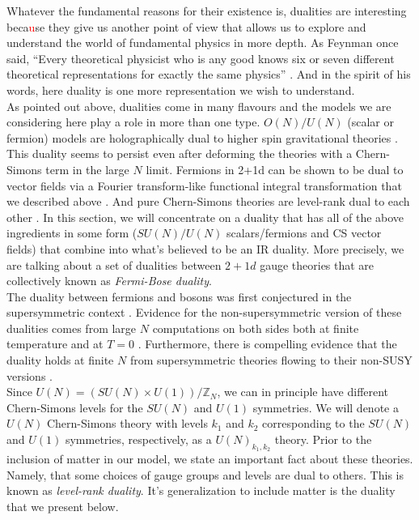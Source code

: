         Whatever the fundamental reasons for their existence is, dualities are interesting beca\textcolor{red}{u}se they give us another point of view that allows us to explore and understand the world of fundamental physics in more depth. As Feynman once said, ``Every theoretical physicist who is any good knows six or seven different theoretical representations for exactly the same physics'' \cite{Feynman_quote}. And in the spirit of his words, here duality is one more representation we wish to understand.\\
        \indent As pointed out above, dualities come in many flavours and the models we are considering here play a role in more than one type. $O(N)/U(N)$ (scalar or fermion) models are holographically dual to higher spin gravitational theories \cite{Klebanov:2002ja}. This duality seems to persist even after deforming the theories with a Chern-Simons term in the large $N$ limit\cite{Aharony:2011jz}. Fermions in 2+1d can be shown to be dual to vector fields via a Fourier transform-like functional integral transformation that we described above \cite{Burgess:1993np, Barci:1995iy}. And pure Chern-Simons theories are level-rank dual to each other \cite{Naculich:1990pa, Camperi:1990dk, Mlawer:1990uv, Nakanishi:1990hj, Naculich:2007nc}. In this section, we will concentrate on a duality that has all of the above ingredients in some form ($SU(N)/U(N)$ scalars/fermions and CS vector fields) that combine into what's believed to be an IR duality. More precisely, we are talking about a set of dualities between $2+1d$ gauge theories that are collectively known as \textit{Fermi-Bose duality}.\\
        \indent The duality between fermions and bosons was first conjectured  in the supersymmetric context \cite{Giveon:2008zn, Benini:2011mf, Aharony:2013dha, Aharony:2014uya}. Evidence for the non-supersymmetric version of these dualities comes from large $N$ computations on both sides both at finite temperature \cite{Aharony:2012ns}  and at $T=0$ \cite{Giombi:2011kc}. Furthermore, there is compelling evidence that the duality holds at finite $N$ from supersymmetric theories flowing to their non-SUSY versions \cite{Jain:2013gza, Gur-Ari:2015pca}.\\
        \indent Since $U(N) = (SU(N)\times U(1))/\mathbb{Z}_N$, we can in principle have different Chern-Simons levels for the $SU(N)$ and $U(1)$ symmetries. We will denote a $U(N)$ Chern-Simons theory with levels $k_1$ and $k_2$ corresponding to the $SU(N)$ and $U(1)$ symmetries, respectively, as a $U(N)_{k_1,k_2}$ theory. Prior to the inclusion of matter in our model, we state an important fact about these theories. Namely, that some choices of gauge groups and levels are dual to others. This is known as \textit{level-rank duality}. It's generalization to include matter is the duality that we present below.

